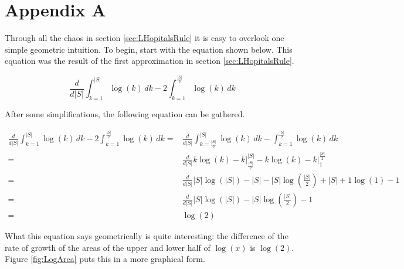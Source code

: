 \documentclass{article}
\begin{document}
\section{Appendix A}
\label{ap:A}

Through all the chaos in section \ref{sec:LHopitalsRule} it is easy to overlook one simple geometric intuition. To begin, start with the equation shown below. This equation was the result of the first approximation in section \ref{sec:LHopitalsRule}.

\begin{equation*}
	\frac{d}{d|S|}
	\int_{k=1}^{|S|}\log(k)\,dk-2\int_{k=1}^{\frac{|S|}{2}}\log(k)\,dk
\end{equation*}

After some simplifications, the following equation can be gathered.

\begin{equation*}
	\begin{split}
		\frac{d}{d|S|}
		\int_{k=1}^{|S|}\log(k)\,dk-2\int_{k=1}^{\frac{|S|}{2}}\log(k)\,dk
		= &
		\frac{d}{d|S|}
		\int_{k=\frac{|S|}{2}}^{|S|}\log(k)\,dk-\int_{k=1}^{\frac{|S|}{2}}\log(k)\,dk
		\\
		= &
		\frac{d}{d|S|}
		k\log(k)-k \Big|_{\frac{|S|}{2}}^{|S|}-
		k\log(k)-k \Big|_{1}^{\frac{|S|}{2}}
		\\
		= &
		\frac{d}{d|S|}
		|S|\log(|S|)-|S|
		-|S|\log\left(\frac{|S|}{2}\right)+|S|
		+1\log(1)-1
		\\
		= &
		\frac{d}{d|S|}
		|S|\log(|S|)
		-|S|\log\left( \frac{|S|}{2} \right)
		-1
		\\
		= &
		\log(2)
	\end{split}
\end{equation*}

What this equation says geometrically is quite interesting: the difference of the rate of growth of the areas of the upper and lower half of $\log(x)$ is $\log(2)$. Figure \ref{fig:LogArea} puts this in a more graphical form.
\end{document}
